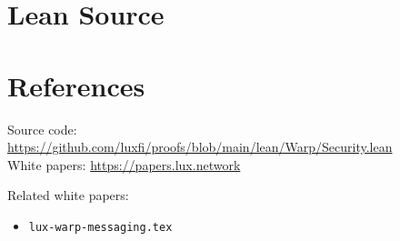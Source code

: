 \documentclass[11pt]{article}
\begin{document}
\section{Lean Source}


\section{References}
\noindent Source code: \url{https://github.com/luxfi/proofs/blob/main/lean/Warp/Security.lean}\\
\noindent White papers: \url{https://papers.lux.network}

\noindent Related white papers:
\begin{itemize}
  \item \texttt{lux-warp-messaging.tex}
\end{itemize}
\end{document}
